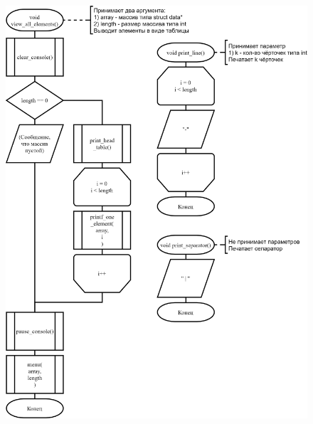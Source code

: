 \begin{figure}[!htp]
    \includegraphics{../src/menu/view_all_elements/view_all_elements-1.png}
\end{figure}

